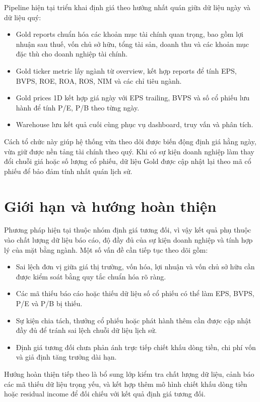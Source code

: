 \documentclass[12pt,a4paper]{article}
\begin{document}
Pipeline hiện tại triển khai định giá theo hướng nhất quán giữa dữ liệu ngày và dữ liệu quý:

\begin{itemize}
    \item Gold reports chuẩn hóa các khoản mục tài chính quan trọng, bao gồm lợi nhuận sau thuế, vốn chủ sở hữu, tổng tài sản, doanh thu và các khoản mục đặc thù cho doanh nghiệp tài chính.
    \item Gold ticker metric lấy ngành từ overview, kết hợp reports để tính EPS, BVPS, ROE, ROA, ROS, NIM và các chỉ tiêu ngành.
    \item Gold prices 1D kết hợp giá ngày với EPS trailing, BVPS và số cổ phiếu lưu hành để tính P/E, P/B theo từng ngày.
    \item Warehouse lưu kết quả cuối cùng phục vụ dashboard, truy vấn và phân tích.
\end{itemize}

Cách tổ chức này giúp hệ thống vừa theo dõi được biến động định giá hằng ngày, vừa giữ được nền tảng tài chính theo quý. Khi có sự kiện doanh nghiệp làm thay đổi chuỗi giá hoặc số lượng cổ phiếu, dữ liệu Gold được cập nhật lại theo mã cổ phiếu để bảo đảm tính nhất quán lịch sử.

\section{Giới hạn và hướng hoàn thiện}

Phương pháp hiện tại thuộc nhóm định giá tương đối, vì vậy kết quả phụ thuộc vào chất lượng dữ liệu báo cáo, độ đầy đủ của sự kiện doanh nghiệp và tính hợp lý của mặt bằng ngành. Một số vấn đề cần tiếp tục theo dõi gồm:

\begin{itemize}
    \item Sai lệch đơn vị giữa giá thị trường, vốn hóa, lợi nhuận và vốn chủ sở hữu cần được kiểm soát bằng quy tắc chuẩn hóa rõ ràng.
    \item Các mã thiếu báo cáo hoặc thiếu dữ liệu số cổ phiếu có thể làm EPS, BVPS, P/E và P/B bị thiếu.
    \item Sự kiện chia tách, thưởng cổ phiếu hoặc phát hành thêm cần được cập nhật đầy đủ để tránh sai lệch chuỗi dữ liệu lịch sử.
    \item Định giá tương đối chưa phản ánh trực tiếp chiết khấu dòng tiền, chi phí vốn và giả định tăng trưởng dài hạn.
\end{itemize}

Hướng hoàn thiện tiếp theo là bổ sung lớp kiểm tra chất lượng dữ liệu, cảnh báo các mã thiếu dữ liệu trọng yếu, và kết hợp thêm mô hình chiết khấu dòng tiền hoặc residual income để đối chiếu với kết quả định giá tương đối.
\end{document}
